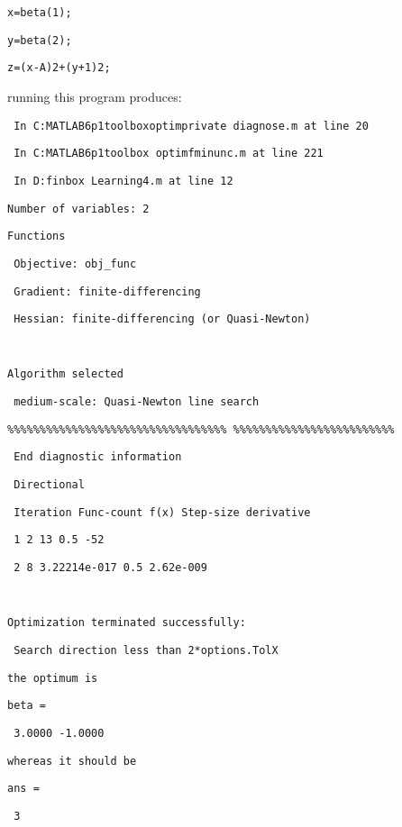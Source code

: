 \documentclass[12pt,a4paper]{article}
\begin{document}
\texttt{x=beta(1);}

\texttt{y=beta(2);}

\texttt{z=(x-A)2+(y+1)2;}

running this program produces:

\texttt{\TEXTsymbol{>} In C:\TEXTsymbol{\backslash}MATLAB6p1\TEXTsymbol{%
\backslash}toolbox\TEXTsymbol{\backslash}optim\TEXTsymbol{\backslash}private%
\TEXTsymbol{\backslash}diagnose.m at line 20}

\texttt{\ In C:\TEXTsymbol{\backslash}MATLAB6p1\TEXTsymbol{\backslash}toolbox%
\TEXTsymbol{\backslash}optim\TEXTsymbol{\backslash}fminunc.m at line 221}

\texttt{\ In D:\TEXTsymbol{\backslash}finbox\TEXTsymbol{\backslash}%
Learning4.m at line 12}

\texttt{Number of variables: 2}

\texttt{Functions }

\texttt{\ Objective: obj\_func}

\texttt{\ Gradient: finite-differencing}

\texttt{\ Hessian: finite-differencing (or Quasi-Newton)}

\texttt{\ }

\texttt{Algorithm selected}

\texttt{\ medium-scale: Quasi-Newton line search}

\texttt{\%\%\%\%\%\%\%\%\%\%\%\%\%\%\%\%\%\%\%\%\%\%\%\%\%\%\%\%\%\%\%\%\%\%%
\%\%\%\%\%\%\%\%\%\%\%\%\%\%\%\%\%\%\%\%\%\%\%\%\%}

\texttt{\ End diagnostic information }

\texttt{\ Directional }

\texttt{\ Iteration Func-count f(x) Step-size derivative }

\texttt{\ 1 2 13 0.5 -52 }

\texttt{\ 2 8 3.22214e-017 0.5 2.62e-009 }

\texttt{\ }

\texttt{Optimization terminated successfully:}

\texttt{\ Search direction less than 2*options.TolX}

\texttt{the optimum is}

\texttt{beta =}

\texttt{\ 3.0000 -1.0000}

\texttt{whereas it should be }

\texttt{ans =}

\texttt{\ 3}
\end{document}
